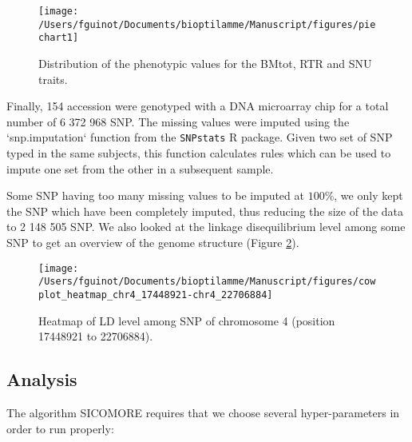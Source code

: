 \documentclass[]{book}
\begin{document}
\begin{figure}

{\centering \texttt{[image: /Users/fguinot/Documents/bioptilamme/Manuscript/figures/piechart1]} 

}

\caption{Distribution of the phenotypic values for the BMtot, RTR and SNU traits.}\label{fig:piechart1}
\end{figure}

Finally, 154 accession were genotyped with a DNA microarray chip for a
total number of 6 372 968 SNP. The missing values were imputed using the
`snp.imputation` function from the \texttt{SNPstats} R package. Given two set
of SNP typed in the same subjects, this function calculates rules which
can be used to impute one set from the other in a subsequent sample.

Some SNP having too many missing values to be imputed at \(100\%\), we
only kept the SNP which have been completely imputed, thus reducing the
size of the data to 2 148 505 SNP. We also looked at the linkage
disequilibrium level among some SNP to get an overview of the genome
structure (Figure \ref{fig:heatmapchr4}).



\begin{figure}

{\centering \texttt{[image: /Users/fguinot/Documents/bioptilamme/Manuscript/figures/cowplot\_heatmap\_chr4\_17448921-chr4\_22706884]} 

}

\caption{Heatmap of LD level among SNP of chromosome 4 (position 17448921 to 22706884).}\label{fig:heatmapchr4}
\end{figure}

\hypertarget{analysis}{%
\subsection{Analysis}\label{analysis}}

The algorithm SICOMORE requires that we choose several hyper-parameters
in order to run properly:
\end{document}
